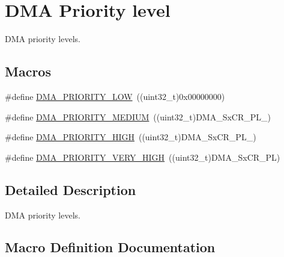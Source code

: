 \hypertarget{group___d_m_a___priority__level}{}\section{D\+MA Priority level}
\label{group___d_m_a___priority__level}


D\+MA priority levels.  


\subsection*{Macros}
\begin{DoxyCompactItemize}
\item 
\#define \hyperlink{group___d_m_a___priority__level_ga0d1ed2bc9229ba3c953002bcf3a72130}{D\+M\+A\+\_\+\+P\+R\+I\+O\+R\+I\+T\+Y\+\_\+\+L\+OW}~((uint32\+\_\+t)0x00000000)
\item 
\#define \hyperlink{group___d_m_a___priority__level_gad6fbeee76fd4a02cbed64365bb4c1781}{D\+M\+A\+\_\+\+P\+R\+I\+O\+R\+I\+T\+Y\+\_\+\+M\+E\+D\+I\+UM}~((uint32\+\_\+t)D\+M\+A\+\_\+\+Sx\+C\+R\+\_\+\+P\+L\+\_)
\item 
\#define \hyperlink{group___d_m_a___priority__level_ga6b2f5c5e22895f8b4bd52a27ec6cae2a}{D\+M\+A\+\_\+\+P\+R\+I\+O\+R\+I\+T\+Y\+\_\+\+H\+I\+GH}~((uint32\+\_\+t)D\+M\+A\+\_\+\+Sx\+C\+R\+\_\+\+P\+L\+\_)
\item 
\#define \hyperlink{group___d_m_a___priority__level_gaed0542331a4d875d1d8d5b2878e9372c}{D\+M\+A\+\_\+\+P\+R\+I\+O\+R\+I\+T\+Y\+\_\+\+V\+E\+R\+Y\+\_\+\+H\+I\+GH}~((uint32\+\_\+t)D\+M\+A\+\_\+\+Sx\+C\+R\+\_\+\+PL)
\end{DoxyCompactItemize}


\subsection{Detailed Description}
D\+MA priority levels. 



\subsection{Macro Definition Documentation}
